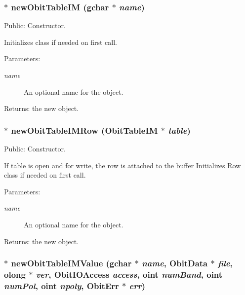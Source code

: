 \subsubsection{$\ast$ new\-Obit\-Table\-IM (gchar $\ast$ {\em name})}\label{ObitTableIM_8c_a16}


Public: Constructor. 

Initializes class if needed on first call. \begin{Desc}
\item[Parameters:]
\begin{description}
\item[{\em name}]An optional name for the object. \end{description}
\end{Desc}
\begin{Desc}
\item[Returns:]the new object. \end{Desc}
\subsubsection{$\ast$ new\-Obit\-Table\-IMRow ({\bf Obit\-Table\-IM} $\ast$ {\em table})}\label{ObitTableIM_8c_a14}


Public: Constructor. 

If table is open and for write, the row is attached to the buffer Initializes Row class if needed on first call. \begin{Desc}
\item[Parameters:]
\begin{description}
\item[{\em name}]An optional name for the object. \end{description}
\end{Desc}
\begin{Desc}
\item[Returns:]the new object. \end{Desc}
\subsubsection{$\ast$ new\-Obit\-Table\-IMValue (gchar $\ast$ {\em name}, {\bf Obit\-Data} $\ast$ {\em file}, {\bf olong} $\ast$ {\em ver}, Obit\-IOAccess {\em access}, {\bf oint} {\em num\-Band}, {\bf oint} {\em num\-Pol}, {\bf oint} {\em npoly}, {\bf Obit\-Err} $\ast$ {\em err})}\label{ObitTableIM_8c_a18}


